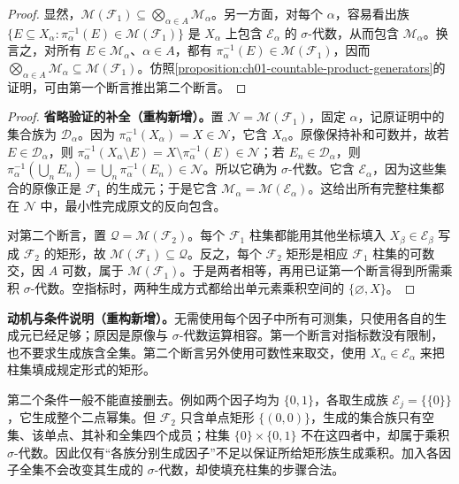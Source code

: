 \documentclass[../../main.tex]{subfiles}%
\begin{document}
\begin{proof}
显然，$\mathscr{M}(\mathscr{F}_1)\subseteq\bigotimes_{\alpha\in A}\mathscr{M}_\alpha$。另一方面，对每个 $\alpha$，容易看出族 $\{E\subseteq X_\alpha:\pi_\alpha^{-1}(E)\in\mathscr{M}(\mathscr{F}_1)\}$ 是 $X_\alpha$ 上包含 $\mathscr{E}_\alpha$ 的 $\sigma$-代数，从而包含 $\mathscr{M}_\alpha$。换言之，对所有 $E\in\mathscr{M}_\alpha$、$\alpha\in A$，都有 $\pi_\alpha^{-1}(E)\in\mathscr{M}(\mathscr{F}_1)$，因而 $\bigotimes_{\alpha\in A}\mathscr{M}_\alpha\subseteq\mathscr{M}(\mathscr{F}_1)$。仿照\cref{proposition:ch01-countable-product-generators}的证明，可由第一个断言推出第二个断言。
\end{proof}
\begin{proof}
\textbf{省略验证的补全（重构新增）。}置 $\mathscr{N}=\mathscr{M}(\mathscr{F}_1)$，固定 $\alpha$，记原证明中的集合族为 $\mathscr{D}_\alpha$。因为 $\pi_\alpha^{-1}(X_\alpha)=X\in\mathscr{N}$，它含 $X_\alpha$。原像保持补和可数并，故若 $E\in\mathscr{D}_\alpha$，则 $\pi_\alpha^{-1}(X_\alpha\setminus E)=X\setminus\pi_\alpha^{-1}(E)\in\mathscr{N}$；若 $E_n\in\mathscr{D}_\alpha$，则 $\pi_\alpha^{-1}(\bigcup_nE_n)=\bigcup_n\pi_\alpha^{-1}(E_n)\in\mathscr{N}$。所以它确为 $\sigma$-代数。它含 $\mathscr{E}_\alpha$，因为这些集合的原像正是 $\mathscr{F}_1$ 的生成元；于是它含 $\mathscr{M}_\alpha=\mathscr{M}(\mathscr{E}_\alpha)$。这给出所有完整柱集都在 $\mathscr{N}$ 中，最小性完成原文的反向包含。

对第二个断言，置 $\mathscr{Q}=\mathscr{M}(\mathscr{F}_2)$。每个 $\mathscr{F}_1$ 柱集都能用其他坐标填入 $X_\beta\in\mathscr{E}_\beta$ 写成 $\mathscr{F}_2$ 的矩形，故 $\mathscr{M}(\mathscr{F}_1)\subseteq\mathscr{Q}$。反之，每个 $\mathscr{F}_2$ 矩形是相应 $\mathscr{F}_1$ 柱集的可数交，因 $A$ 可数，属于 $\mathscr{M}(\mathscr{F}_1)$。于是两者相等，再用已证第一个断言得到所需乘积 $\sigma$-代数。空指标时，两种生成方式都给出单元素乘积空间的 $\{\varnothing,X\}$。
\end{proof}
\begin{remark}
\textbf{动机与条件说明（重构新增）。}无需使用每个因子中所有可测集，只使用各自的生成元已经足够；原因是原像与 $\sigma$-代数运算相容。第一个断言对指标数没有限制，也不要求生成族含全集。第二个断言另外使用可数性来取交，使用 $X_\alpha\in\mathscr{E}_\alpha$ 来把柱集填成规定形式的矩形。

第二个条件一般不能直接删去。例如两个因子均为 $\{0,1\}$，各取生成族 $\mathscr{E}_j=\{\{0\}\}$，它生成整个二点幂集。但 $\mathscr{F}_2$ 只含单点矩形 $\{(0,0)\}$，生成的集合族只有空集、该单点、其补和全集四个成员；柱集 $\{0\}\times\{0,1\}$ 不在这四者中，却属于乘积 $\sigma$-代数。因此仅有“各族分别生成因子”不足以保证所给矩形族生成乘积。加入各因子全集不会改变其生成的 $\sigma$-代数，却使填充柱集的步骤合法。
\end{remark}
\end{document}
